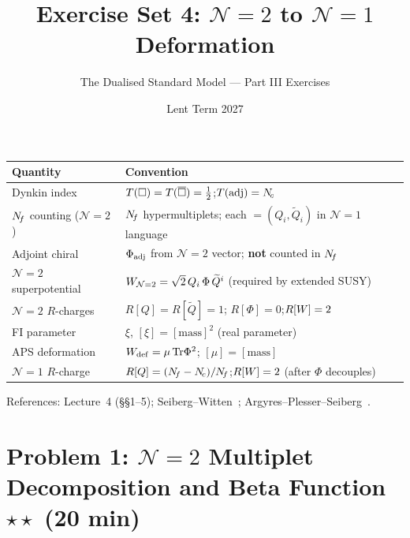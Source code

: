 \documentclass[11pt,a4paper]{article}
\title{\textbf{Exercise Set 4: $\mathcal{N}=2$ to $\mathcal{N}=1$ Deformation}}
\author{The Dualised Standard Model --- Part III Exercises}
\date{Lent Term 2027}
\begin{document}
\maketitle

\begin{conventionbox}[title={Conventions for these exercises}]
\renewcommand{\arraystretch}{1.3}
\begin{tabular}{@{}l l@{}}
\toprule
\textbf{Quantity} & \textbf{Convention} \\
\midrule
Dynkin index & $T(\square) = T(\overline{\square}) = \tfrac{1}{2}$;\quad $T(\mathrm{adj}) = N_{\!c}$ \\
$N_{\!f}$ counting ($\mathcal{N}=2$) & $N_{\!f}$ hypermultiplets;
  each $= (Q_i, \widetilde{Q}_i)$ in $\mathcal{N}=1$ language \\
Adjoint chiral & $\Phi_{\mathrm{adj}}$ from $\mathcal{N}=2$ vector;
  \textbf{not} counted in $N_{\!f}$ \\
$\mathcal{N}=2$ superpotential & $W_{\mathcal{N}=2}
  = \sqrt{2}\, Q_i\, \Phi\, \widetilde{Q}^i$ (required by extended SUSY) \\
$\mathcal{N}=2$ $R$-charges & $R[Q] = R[\widetilde{Q}] = 1$;\quad
  $R[\Phi] = 0$;\quad $R[W] = 2$ \\
FI parameter & $\xi$,\; $[\xi] = [\mathrm{mass}]^2$ (real parameter) \\
APS deformation & $W_{\mathrm{def}} = \mu\,\mathrm{Tr}\Phi^2$;\quad
  $[\mu] = [\mathrm{mass}]$ \\
$\mathcal{N}=1$ $R$-charge & $R[Q] = (N_{\!f} - N_{\!c})/N_{\!f}$;\quad $R[W] = 2$
  (after $\Phi$ decouples) \\
\bottomrule
\end{tabular}

\medskip

\noindent References: Lecture~4 (\S\S1--5); Seiberg--Witten~\cite{SW1994};
Argyres--Plesser--Seiberg~\cite{APS1996}.
\end{conventionbox}

\bigskip


\section*{Problem 1: $\mathcal{N}=2$ Multiplet Decomposition and Beta
  Function \hfill $\star\star$ \normalsize(20 min)}
\label{prob:multiplet-decomp}
\end{document}
